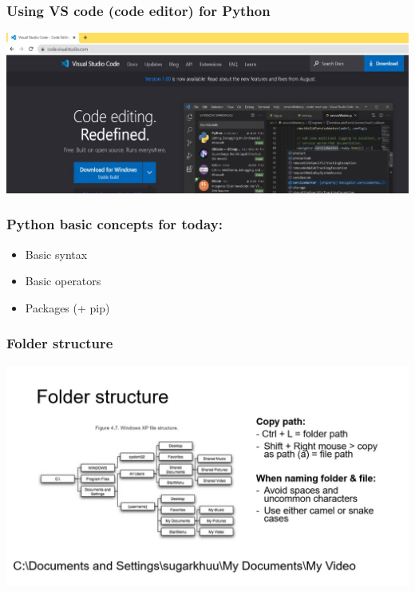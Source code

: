 \documentclass{beamer}
\begin{document}
\begin{frame}
    \frametitle{Using VS code (code editor) for Python}
    \centering
    \includegraphics[scale = 0.5]{figures/vscode.jpg}
\end{frame}

\begin{frame}
    \frametitle{Python basic concepts for today:}

    \begin{itemize}
        \item Basic syntax
        \item Basic operators
        \item Packages (+ pip) %
    \end{itemize}
\end{frame}

\begin{frame}
    \frametitle{Folder structure}
    \centering
    \includegraphics[scale = 0.5]{figures/folder.jpg}
\end{frame}
\end{document}
